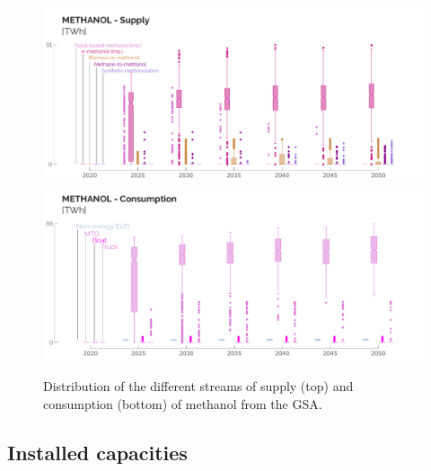 \documentclass[11pt,twoside,a4paper,english]{article}
\begin{document}
\begin{appendices}
\begin{figure}[p!]
\centering
\includegraphics[width=\textwidth]{UQ_Methanol_Prod.pdf}
\includegraphics[width=\textwidth]{UQ_Methanol_Cons.pdf}
\caption{Distribution of the different streams of supply (top) and consumption (bottom) of methanol from the \acrfull{GSA}.}
\label{fig:results_uq_prod_cons_Methanol}
\end{figure}

\clearpage

\subsection{Installed capacities}
\label{app:UQ_tech_cap}



\end{appendices}
\end{document}
